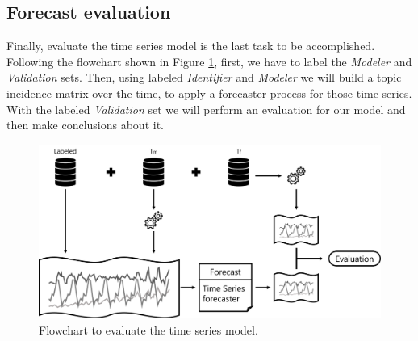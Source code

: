 \subsection{Forecast evaluation}

Finally, evaluate the time series model is the last task to be accomplished. Following the flowchart shown in Figure \ref{fig:forecast}, first, we have to label the \textit{Modeler} and \textit{Validation} sets. Then, using labeled \textit{Identifier} and \textit{Modeler} we will build a topic incidence matrix over the time, to apply a forecaster process for those time series. With the labeled \textit{Validation} set we will perform an evaluation for our model and then make conclusions about it.

\begin{figure}[h!]
	\centering
	\includegraphics[width=\linewidth]{01.Chapters/04.Materials/forecast}
	\caption{Flowchart to evaluate the time series model.}
	\label{fig:forecast}
\end{figure}
